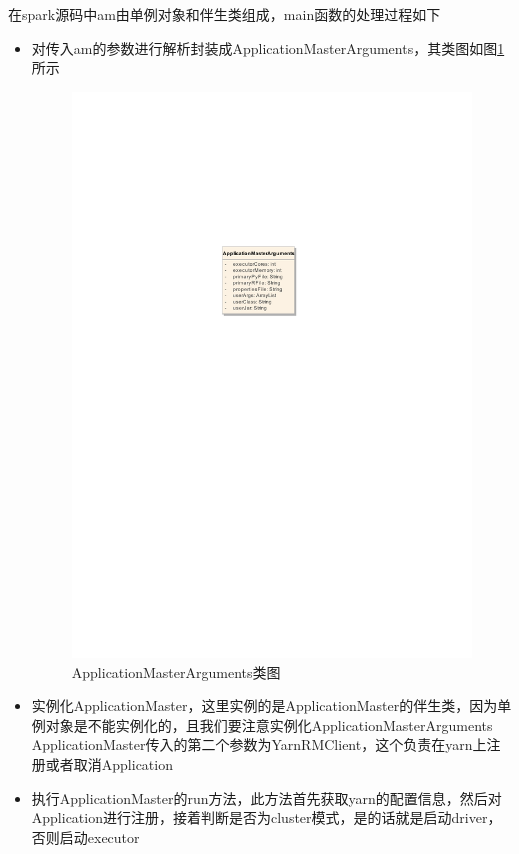 在spark源码中am由单例对象和伴生类组成，main函数的处理过程如下
\begin{itemize}
	\item 对传入am的参数进行解析封装成ApplicationMasterArguments，其类图如图\ref{ApplicationMasterArguments}所示
\begin{figure}[H] 
	\centering
	\includegraphics{figures/ApplicationMasterArguments.pdf}
	\caption{ApplicationMasterArguments类图}
	\label{ApplicationMasterArguments}
\end{figure}
	\item 实例化ApplicationMaster，这里实例的是ApplicationMaster的伴生类，因为单例对象是不能实例化的，且我们要注意实例化ApplicationMasterArguments
	ApplicationMaster传入的第二个参数为YarnRMClient，这个负责在yarn上注册或者取消Application
	\item 执行ApplicationMaster的run方法，此方法首先获取yarn的配置信息，然后对Application进行注册，接着判断是否为cluster模式，是的话就是启动driver，否则启动executor
\end{itemize}
